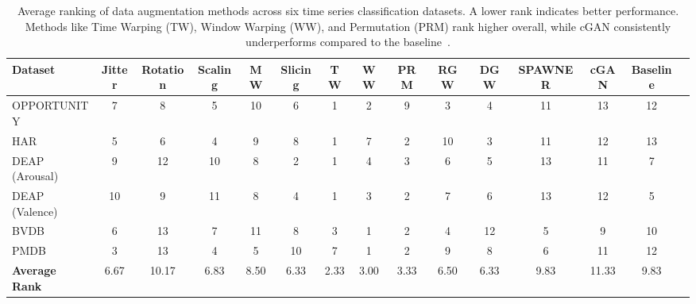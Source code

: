 \documentclass[a4paper,12pt]{report}
\begin{document}
\begin{table}[h!]
\centering
\renewcommand{\arraystretch}{1.3}
\begin{adjustbox}{max width=\textwidth}
\begin{tabular}{lcccccccccccccc}
\toprule
\textbf{Dataset} & \textbf{Jitter} & \textbf{Rotation} & \textbf{Scaling} & \textbf{MW} & \textbf{Slicing} & \textbf{TW} & \textbf{WW} & \textbf{PRM} & \textbf{RGW} & \textbf{DGW} & \textbf{SPAWNER} & \textbf{cGAN} & \textbf{Baseline} \\
\midrule
OPPORTUNITY     & 7 & 8  & 5  & 10 & 6  & 1 & 2 & 9 & 3 & 4  & 11 & 13 & 12 \\
HAR             & 5 & 6  & 4  & 9  & 8  & 1 & 7 & 2 & 10 & 3  & 11 & 12 & 13 \\
DEAP (Arousal)  & 9 & 12 & 10 & 8  & 2  & 1 & 4 & 3 & 6 & 5  & 13 & 11 & 7  \\
DEAP (Valence)  & 10 & 9 & 11 & 8  & 4  & 1 & 3 & 2 & 7 & 6  & 13 & 12 & 5  \\
BVDB            & 6 & 13 & 7  & 11 & 8  & 3 & 1 & 2 & 4 & 12 & 5  & 9  & 10 \\
PMDB            & 3 & 13 & 4  & 5  & 10 & 7 & 1 & 2 & 9 & 8  & 6  & 11 & 12 \\
\midrule
\textbf{Average Rank} & 6.67 & 10.17 & 6.83 & 8.50 & 6.33 & 2.33 & 3.00 & 3.33 & 6.50 & 6.33 & 9.83 & 11.33 & 9.83 \\
\bottomrule
\end{tabular}
\end{adjustbox}
\caption{Average ranking of data augmentation methods across six time series classification datasets. A lower rank indicates better performance. Methods like Time Warping (TW), Window Warping (WW), and Permutation (PRM) rank higher overall, while cGAN consistently underperforms compared to the baseline~\cite{gao2024dataaugmentationtimeseriesclassification}.}
\label{tab:augmentation-ranking}
\end{table}
\end{document}
